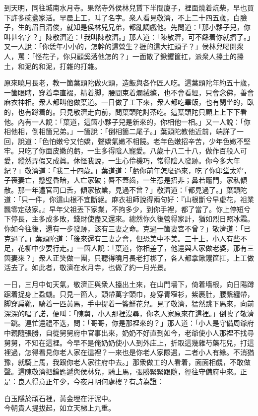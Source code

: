 到天明，同往城南水月寺。果然寺外侯林兒賃下半間廈子，{}裡面燒着炕柴，早也買下許多碗盞家活。早晨上工，叫了名字。衆人看見敬濟，不上二十四五歲，白臉子，生的眉目清俊，就知是侯林兒兄弟，都亂調戲他。先問道：「那小夥子兒，你叫甚名字？」陳敬濟道：「我叫陳敬濟。」那人道：「陳敬濟，可不繇着你就擠了。」又一人說：「你恁年小小的，怎幹的這營生？捱的這大扛頭子？」{}侯林兒喝開衆人，罵：「怪花子，你只顧奚落他怎的？」一面散了鍬钁筐扛，派衆人擡土的擡土，和泥的和泥，打雜的打雜。

原來曉月長老，教一箇葉頭陀做火頭，造飯與各作匠人吃。這葉頭陀年約五十歲，一箇眼瞎，穿着皁直裰，精着脚，腰間束着爛絨縧，也不會看經，只會念佛，善會麻衣神相。衆人都叫他做葉道。一日做了工下來，衆人都吃畢飯，也有閑坐的，臥的，也有蹲着的。{}只見敬濟走向前，問葉頭陀討茶吃。這葉頭陀只顧上上下下看他。內有一人說：「葉道，這箇小夥子兒是新來的，你相他一相。」又一人說：「你相他相，倒相箇兄弟。」一箇說：「倒相箇二尾子。」葉頭陀教他近前，端詳了一回，說道：「色怕嫩兮又怕嬌，聲嬌氣嫩不相饒。老年色嫩招辛苦，少年色嫩不堅牢。只吃了你面皮嫩的虧，一生多得陰人寵愛。八歲十八二十八，做作百般人可愛，縱然弄假又成眞。休怪我說，一生心伶機巧，常得陰人發跡。你今多大年紀？」敬濟道：「我二十四歲。」葉道道：「虧你前年怎麼過來，吃了你印堂太窄，子䘮妻亡，懸璧昏暗，人亡家破；唇不蓋齒，一生惹是招非；鼻若竈門，家私傾散。那一年遭官司口舌，傾家散業，見過不曾？」敬濟道：「都見過了。」葉頭陀道：「只一件，你這山根不宜斷絕。麻衣祖師說得兩句好：『山根斷兮早虛花，祖業飄零定破家。』早年父祖丟下家業，不拘多少，到你手裡，都了當了。你上停短兮下停長，主多成多敗，錢財使盡又還來。總然你久後營得家計，猶如烈日照冰霜。你如今往後，還有一步發跡，該有三妻之命。克過一箇妻宮不曾？」敬濟道：「已克過了。」葉頭陀道：「後來還有三妻之會，但恐美中不美。三十上，小人有些不足，花柳中少要行走。」一箇人說：「葉道，你相差了，他還與人家做老婆，那有三箇妻來？」衆人正笑做一團，只聽得曉月長老打梆了，各人都拿鍬钁筐扛，上工做活去了。如此者，敬濟在水月寺，也做了約一月光景。

一日，三月中旬天氣，敬濟正與衆人擡出土來，在山門墻下，倚着墻根，向日陽蹲踞着捉身上蝨蟣。只見一箇人，頭帶萬字頭巾，身穿青窄衫，紫裹肚，腰繫纏帶，脚穿扁靴，騎着一匹黃馬，手中提着一籃鮮花兒。{}見了敬濟，猛然跳下馬來，向前深深的唱了諾，便叫：「陳舅，小人那裡沒尋，你老人家原來在這裡。」倒唬了敬濟一跳。連忙還禮不迭，問：「哥哥，你是那裡來的？」那人道：「小人是守備周爺府中親隨張勝，自從舅舅府中官事出來，奶奶不好直到如今，老爺使小人那裡不找尋舅舅，不知在這裡。今早不是俺奶奶使小人到外庄上，折取這幾雜芍藥花兒，打這裡過，怎得看見你老人家在這裡？一來也是你老人家際遇，二者小人有緣。不消猶豫，就騎上馬，我跟你老人家往府中去。」那衆做工的人看着，面面相覷，不敢做聲。{}這陳敬濟把鑰匙遞與侯林兒，騎上馬，張勝緊緊跟隨，徑往守備府中來。正是：良人得意正年少，今夜月明何處樓？有詩為證：

\begin{myquote}
白玉隱於頑石裡，黃金埋在汙泥中。\\今朝貴人提拔起，如立天梯上九重。
\end{myquote}

